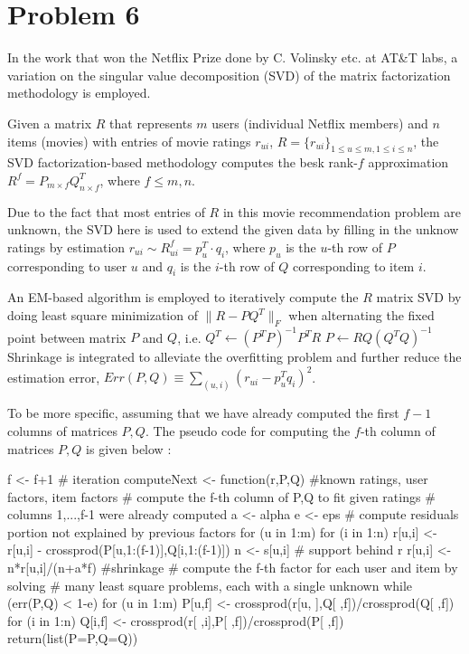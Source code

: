 \documentclass{article}
\begin{document}
\newpage
\section*{Problem 6}
\hspace{12 pt} In the work that won the Netflix Prize done by C. Volinsky etc. at AT\&T labs, a variation
on the singular value decomposition (SVD) of the matrix factorization methodology is employed.

Given a matrix $R$ that represents $m$ users (individual Netflix members) and $n$ items (movies)
with entries of movie ratings $r_{ui}$, $R=\{r_{ui}\}_{1\leq u\leq m, 1\leq i\leq n}$,
the SVD factorization-based methodology computes the besk rank-$f$ approximation
$R^f=P_{m\times f}Q_{n\times f}^T$, where $f\leq m,n$.

Due to the fact that most entries of $R$ in this movie recommendation problem are unknown,
the SVD here is used to extend the given data by filling in the unknow ratings by estimation 
$r_{ui} \sim R_{ui}^f = p_u^T \cdot q_i$, where $p_u$ is the $u$-th row of $P$ corresponding to user $u$
and $q_i$ is the $i$-th row of $Q$ corresponding to item $i$.

An EM-based algorithm is employed to iteratively compute the $R$ matrix SVD by doing
least square minimization of $\|R-PQ^T\|_F$ when alternating the fixed point between
matrix $P$ and $Q$, i.e. \newline
$Q^T \leftarrow (P^TP)^{-1}P^TR$ \newline
$P \leftarrow RQ(Q^TQ)^{-1}$\newline
Shrinkage is integrated to alleviate the overfitting problem and further reduce the estimation error,\newline
$Err(P,Q)\equiv \displaystyle\sum_{(u,i)}(r_{ui}-p_u^Tq_i)^2$.

To be more specific, assuming that we have already computed the first $f-1$ columns of
matrices $P,Q$. The pseudo code for computing the $f$-th column of matrices $P,Q$ is given below
\cite{KDD07}:

f <- f+1 # iteration
computeNext <- function(r,P,Q){ #known ratings, user factors, item factors
	# compute the f-th column of P,Q to fit given ratings
	# columns 1,...,f-1 were already computed
	a <- alpha
	e <- eps
	# compute residuals portion not explained by previous factors
	for (u in 1:m){
		for (i in 1:n){
			r[u,i] <- r[u,i] - crossprod(P[u,1:(f-1)],Q[i,1:(f-1)])
			n <- s[u,i] # support behind r
			r[u,i] <- n*r[u,i]/(n+a*f) #shrinkage
		}
	}
	# compute the f-th factor for each user and item by solving
	# many least square problems, each with a single unknown
	while (err(P,Q) < 1-e){
		for (u in 1:m){
			P[u,f] <- crossprod(r[u, ],Q[ ,f])/crossprod(Q[ ,f])
		}
		for (i in 1:n){
			Q[i,f] <- crossprod(r[ ,i],P[ ,f])/crossprod(P[ ,f])
		}
	}
	return(list(P=P,Q=Q))
}
\end{document}
